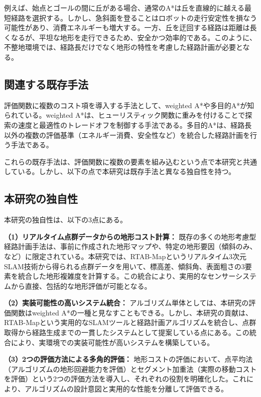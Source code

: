 例えば、始点とゴールの間に丘がある場合、通常のA*は丘を直線的に越える最短経路を選択する。しかし、急斜面を登ることはロボットの走行安定性を損なう可能性があり、消費エネルギーも増大する。一方、丘を迂回する経路は距離は長くなるが、平坦な地形を走行できるため、安全かつ効率的である。このように、不整地環境では、経路長だけでなく地形の特性を考慮した経路計画が必要となる。

\subsection{関連する既存手法}

評価関数に複数のコスト項を導入する手法として、weighted A*や多目的A*が知られている。weighted A*は、ヒューリスティック関数に重みを付けることで探索の速度と最適性のトレードオフを制御する手法である。多目的A*は、経路長以外の複数の評価基準（エネルギー消費、安全性など）を統合した経路計画を行う手法である。

これらの既存手法は、評価関数に複数の要素を組み込むという点で本研究と共通している。しかし、以下の点で本研究は既存手法と異なる独自性を持つ。

\subsection{本研究の独自性}

本研究の独自性は、以下の3点にある。

\textbf{（1）リアルタイム点群データからの地形コスト計算：}
既存の多くの地形考慮型経路計画手法は、事前に作成された地形マップや、特定の地形要因（傾斜のみ、など）に限定されている。本研究では、RTAB-Mapというリアルタイム3次元SLAM技術から得られる点群データを用いて、標高差、傾斜角、表面粗さの3要素を統合した地形複雑度を計算する。この統合により、実用的なセンサーシステムから直接、包括的な地形評価が可能となる。

\textbf{（2）実装可能性の高いシステム統合：}
アルゴリズム単体としては、本研究の評価関数はweighted A*の一種と見なすこともできる。しかし、本研究の貢献は、RTAB-Mapという実用的なSLAMツールと経路計画アルゴリズムを統合し、点群取得から経路生成までの一貫したシステムとして提案している点にある。この統合により、実環境での実装可能性が高いシステムを構築している。

\textbf{（3）2つの評価方法による多角的評価：}
地形コストの評価において、点平均法（アルゴリズムの地形回避能力を評価）とセグメント加重法（実際の移動コストを評価）という2つの評価方法を導入し、それぞれの役割を明確化した。これにより、アルゴリズムの設計意図と実用的な性能を分離して評価できる。


